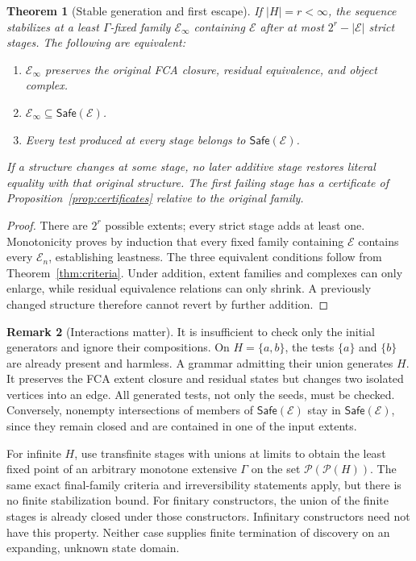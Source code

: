 \documentclass[11pt]{article}
\newtheorem{theorem}{Theorem}[section]
\theoremstyle{definition}
\newtheorem{remark}[theorem]{Remark}
\newcommand{\Pow}{\mathcal P}
\newcommand{\Safe}{\mathsf{Safe}}
\begin{document}
\begin{theorem}[Stable generation and first escape]\label{thm:iteration}
If $|H|=r<\infty$, the sequence stabilizes at a least
$\Gamma$-fixed family $\mathcal E_\infty$ containing $\mathcal E$ after
at most $2^r-|\mathcal E|$ strict stages. The following are equivalent:
\begin{enumerate}[label=(\roman*)]
\item $\mathcal E_\infty$ preserves the original FCA closure, residual
      equivalence, and object complex.
\item $\mathcal E_\infty\subseteq\Safe(\mathcal E)$.
\item Every test produced at every stage belongs to
      $\Safe(\mathcal E)$.
\end{enumerate}
If a structure changes at some stage, no later additive stage restores
literal equality with that original structure. The first failing stage
has a certificate of Proposition~\ref{prop:certificates} relative to the
original family.
\end{theorem}

\begin{proof}
There are $2^r$ possible extents; every strict stage adds at least one.
Monotonicity proves by induction that every fixed family containing
$\mathcal E$ contains every $\mathcal E_n$, establishing leastness.
The three equivalent conditions follow from Theorem~\ref{thm:criteria}.
Under addition, extent families and complexes can only enlarge, while
residual equivalence relations can only shrink. A previously changed
structure therefore cannot revert by further addition.
\end{proof}

\begin{remark}[Interactions matter]
It is insufficient to check only the initial generators and ignore their
compositions. On $H=\{a,b\}$, the tests $\{a\}$ and $\{b\}$ are already
present and harmless. A grammar admitting their union generates $H$.
It preserves the FCA extent closure and residual states but changes two
isolated vertices into an edge. All generated tests, not only the seeds,
must be checked. Conversely, nonempty intersections of members of
$\Safe(\mathcal E)$ stay in $\Safe(\mathcal E)$, since they remain closed
and are contained in one of the input extents.
\end{remark}

For infinite $H$, use transfinite stages with unions at limits to obtain
the least fixed point of an arbitrary monotone extensive $\Gamma$ on
the set $\Pow(\Pow(H))$. The same exact final-family criteria and
irreversibility statements apply, but there is no finite stabilization
bound. For finitary constructors, the union of the finite stages is already
closed under those constructors. Infinitary constructors need not have
this property. Neither case supplies finite termination of discovery on
an expanding, unknown state domain.
\end{document}
